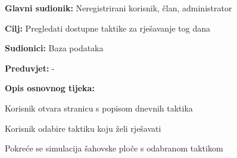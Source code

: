 					\noindent {}
					\begin{packed_item}
	
						\item \textbf{Glavni sudionik: } Neregistrirani korisnik, član, administrator
						\item  \textbf{Cilj: } Pregledati dostupne taktike za rješavanje tog dana
						\item  \textbf{Sudionici: } Baza podataka
						\item  \textbf{Preduvjet: } -
						\item  \textbf{Opis osnovnog tijeka:}
						
						\item[] \begin{packed_enum}
	
							\item Korisnik otvara stranicu s popisom dnevnih taktika
							\item Korisnik odabire taktiku koju želi rješavati
							\item Pokreće se simulacija šahovske ploče s odabranom taktikom
							
						\end{packed_enum}
					\end{packed_item}


